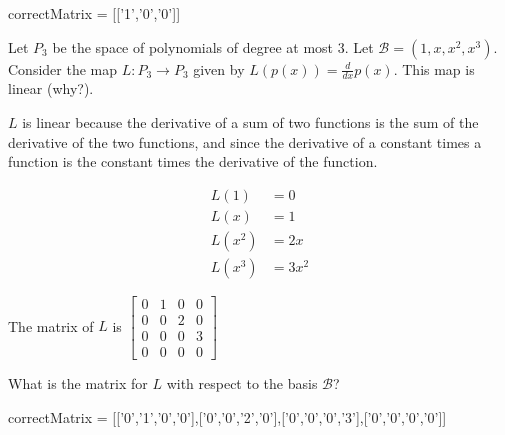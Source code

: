 \documentclass{ximera}
\begin{document}
\begin{problem}
\begin{solution}
    \begin{matrix-answer}
      correctMatrix = [['1','0','0']]
    \end{matrix-answer}
  \end{solution}
\end{problem}

\begin{problem}
  Let $P_3$ be the space of polynomials of degree at most $3$.  Let $\mathcal{B} = (1,x,x^2,x^3)$.  Consider the map $L:P_3 \to P_3$ given by 
  $L(p(x)) = \frac{d}{dx} p(x)$. This map is linear (why?).  
  \begin{solution}
    \begin{hint}
      $L$ is linear because the derivative of a sum of two functions is the sum of the derivative of the two functions, and since the derivative of a constant
      times a function is the constant times the derivative of the function.
    \end{hint}
    \begin{hint}
      \begin{align*}
        L(1) &=0\\
        L(x) &=1\\
        L(x^2)&=2x\\
        L(x^3)&=3x^2
      \end{align*}
    \end{hint}
    \begin{hint}
      The matrix of $L$ is \(\begin{bmatrix} 0&1&0&0\\0&0&2&0\\0&0&0&3\\0&0&0&0\end{bmatrix}\)
    \end{hint}
    What is the matrix for $L$ with respect to the basis $\mathcal{B}$?
    \begin{matrix-answer}
      correctMatrix = [['0','1','0','0'],['0','0','2','0'],['0','0','0','3'],['0','0','0','0']]
    \end{matrix-answer}
  \end{solution}
\end{problem}
\end{document}
